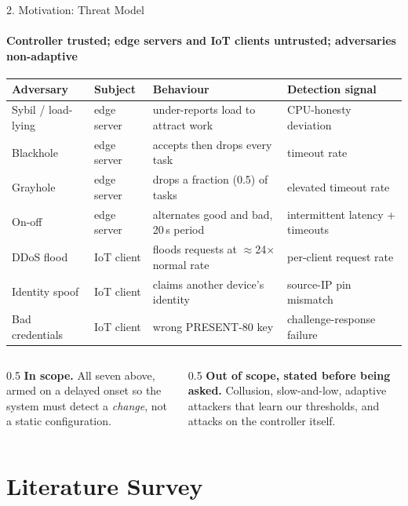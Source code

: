 \documentclass[aspectratio=169, 11pt]{beamer}
\begin{document}
\begin{frame}{2. Motivation: Threat Model}
    \framesubtitle{Controller trusted; edge servers and IoT clients untrusted; adversaries non-adaptive}
    \centering\scriptsize
    \begin{tabular}{@{}llll@{}}
      \toprule
      \textbf{Adversary} & \textbf{Subject} & \textbf{Behaviour} & \textbf{Detection signal}\\
      \midrule
      Sybil / load-lying & edge server & under-reports load to attract work & CPU-honesty deviation\\
      Blackhole          & edge server & accepts then drops every task      & timeout rate\\
      Grayhole           & edge server & drops a fraction (0.5) of tasks    & elevated timeout rate\\
      On-off             & edge server & alternates good and bad, 20\,s period & intermittent latency + timeouts\\
      DDoS flood         & IoT client  & floods requests at $\approx$24$\times$ normal rate & per-client request rate\\
      Identity spoof     & IoT client  & claims another device's identity   & source-IP pin mismatch\\
      Bad credentials    & IoT client  & wrong PRESENT-80 key               & challenge-response failure\\
      \bottomrule
    \end{tabular}

    \vspace{7pt}
    \begin{columns}[T]
      \begin{column}{0.5\textwidth}
        \textbf{In scope.} All seven above, armed on a delayed onset so the
        system must detect a \emph{change}, not a static configuration.
      \end{column}
      \begin{column}{0.5\textwidth}
        \textbf{Out of scope, stated before being asked.} Collusion,
        slow-and-low, adaptive attackers that learn our thresholds, and attacks
        on the controller itself.
      \end{column}
    \end{columns}
\end{frame}

\section{Literature Survey}
\end{document}
